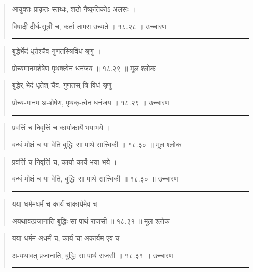 \begin{quotation}

आयुक्तः प्राकृतः स्तब्धः, शठो नैष्कृतिकोऽ अलसः  ।  

विषादी दीर्घ-सूत्री च, कर्ता तामस उच्यते  ॥ १८.२८ ॥  उच्चारण

\noindent\rule{16cm}{0.4pt} 
\end{quotation}


\begin{quotation}

बुद्धेर्भेदं धृतेश्चैव गुणतस्त्रिविधं श्रृणु  ।  

प्रोच्यमानमशेषेण पृथक्त्वेन धनंजय  ॥ १८.२९ ॥  मूल श्लोक
\end{quotation}

\begin{quotation}
बुद्धेर् भेदं धृतेश् चैव, गुणतस् त्रि-विधं श्रृणु  ।  

प्रोच्य-मानम अ-शेषेण, पृथक्-त्वेन धनंजय  ॥ १८.२९ ॥  उच्चारण

\noindent\rule{16cm}{0.4pt} 
\end{quotation}


\begin{quotation}

प्रवत्तिं च निवृत्तिं च कार्याकार्ये भयाभये ।  

बन्धं मोक्षं च या वेति बुद्धिः सा पार्थ सात्त्विकी  ॥ १८.३० ॥  मूल श्लोक
\end{quotation}

\begin{quotation}

प्रवत्तिं च निवृत्तिं च, कार्या कार्ये भया भये ।  

बन्धं मोक्षं च या वेति, बुद्धिः सा पार्थ सात्त्विकी  ॥ १८.३० ॥  उच्चारण

\noindent\rule{16cm}{0.4pt} 
\end{quotation}


\begin{quotation}

यया धर्ममधर्मं च कार्यं चाकार्यमेव च ।  

अयथावत्प्रजानाति बुद्धिः सा पार्थ राजसी  ॥ १८.३१ ॥  मूल श्लोक
\end{quotation}

\begin{quotation}

यया धर्मम अधर्मं च, कार्यं चा अकार्यम एव च ।  

अ-यथावत् प्रजानाति, बुद्धिः सा पार्थ राजसी  ॥ १८.३१ ॥  उच्चारण

\noindent\rule{16cm}{0.4pt} 
\end{quotation}


